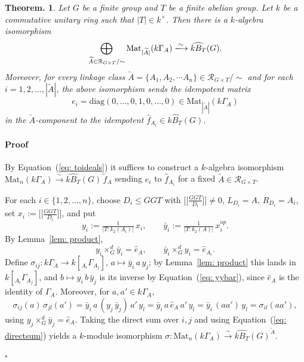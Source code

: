 \documentclass[12pt]{article}
\theoremstyle{change}
\newtheorem{theorem}{Theorem.}[section]
\newenvironment{proof}{\paragraph{Proof}}{\hfill$\square$}
\renewcommand{\le}{\leqslant} %
\newcommand{\calR}{\mathcal{R}}
\newcommand{\Mat}{\mathrm{Mat}}
\newcommand{\1}{{\bf 1}}
\begin{document}
\begin{theorem}{\cite[Theorem 6.2]{BC}}
\label{thm: matrixalg}
Let $G$ be a finite group and $T$ be a finite abelian group. Let $k$ be a commutative unitary ring such that $|T|\in k^{\times}$. Then there is a $k$-algebra isomorphism
\[
    \bigoplus_{\widetilde{A}\in \calR_{G\times T}/\sim}\Mat_{|\widetilde{A}|}(k\Gamma_A)\xlongrightarrow{\sim} \widehat{kB_T}(G).
\]
Moreover, for every linkage class $\widetilde{A}=\{A_1,A_2,\cdots A_n\}\in \calR_{G\times T}/\sim$ and for each $i = 1,2, . . . , |\widetilde{A}|$, the above isomorphism sends the idempotent matrix
\[
e_i = \text{diag}(0,\ldots , 0, 1, 0,\ldots , 0) \in \Mat_{|\widetilde{A}|}(k\Gamma_A)
\]
in the $\widetilde{A}$-component to the idempotent $\widehat{f}_{A_i}\in \widehat{kB_T}(G)$.
\end{theorem}
\begin{proof}
By Equation~(\ref{eq: toideals}) it suffices to construct a $k$-algebra isomorphism $\Mat_n(k\Gamma_A)\xrightarrow{\sim}\widehat{kB_T}(G)\,\widetilde{f}_A$ sending $e_i$ to $\widehat{f}_{A_i}$ for a fixed $\widetilde{A}\in\calR_{G\times T}$.

For each $i\in \{1,2,\ldots, n\}$, choose $D_i\le GGT$ with $\big[\big[\tfrac{GGT}{D_i}\big]\big]\neq0$, $L_{D_i}=A$, $R_{D_i}=A_i$,
set $x_i:=\big[\big[\tfrac{GGT}{D_i}\big]\big]$, and put
\[
  y_i:=\tfrac{1}{|T:k_2(A_i)|}\,x_i,\qquad \bar y_i:=\tfrac{1}{|T:k_2(A)|}\,x_i^{op}.
\]
By Lemma~\ref{lem: product},
\begin{equation}\label{eq: yybar}
  y_i\times_G^d \bar y_i=\widehat{e}_A,\qquad \bar y_i\times_G^d y_i=\widehat{e}_{A_i}.
\end{equation}
Define $\sigma_{ij}:k\Gamma_A\to k[{}_{A_i}\Gamma_{A_j}]$, $a\mapsto\bar y_i\,a\,y_j$; by Lemma~\ref{lem: product}
this lands in $k[{}_{A_i}\Gamma_{A_j}]$, and $b\mapsto y_i\,b\,\bar y_j$ is its inverse by Equation~(\ref{eq: yybar}),
since $\widehat{e}_A$ is the identity of $\Gamma_A$. Moreover, for $a,a'\in k\Gamma_A$,
\begin{equation}\label{eq: sigmamult}
  \sigma_{ij}(a)\,\sigma_{jl}(a')=\bar y_i\,a\,(y_j\,\bar y_j)\,a'\,y_l
  =\bar y_i\,a\,\widehat{e}_A\,a'\,y_l=\bar y_i\,(aa')\,y_l=\sigma_{il}(aa'),
\end{equation}
using $y_j\times_G^d\bar y_j=\widehat{e}_A$. Taking the direct sum over $i,j$ and using Equation~(\ref{eq: directsum}) yields a $k$-module isomorphism $\sigma:\Mat_n(k\Gamma_A)\xrightarrow{\sim}\widehat{kB_T}(G)^{\widetilde{A}}$.


\end{proof}
\end{document}
